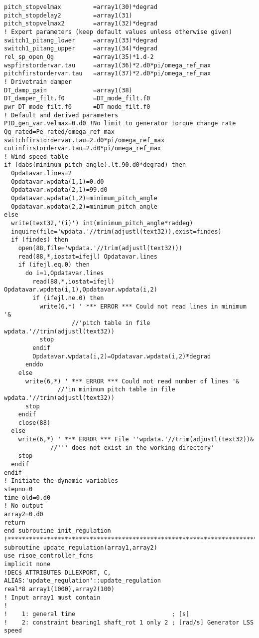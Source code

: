 {\begin{verbatim}
pitch_stopvelmax         =array1(30)*degrad
pitch_stopdelay2         =array1(31)
pitch_stopvelmax2        =array1(32)*degrad
! Expert parameters (keep default values unless otherwise given)
switch1_pitang_lower     =array1(33)*degrad
switch1_pitang_upper     =array1(34)*degrad
rel_sp_open_Qg           =array1(35)*1.d-2
wspfirstordervar.tau     =array1(36)*2.d0*pi/omega_ref_max
pitchfirstordervar.tau   =array1(37)*2.d0*pi/omega_ref_max
! Drivetrain damper
DT_damp_gain             =array1(38)
DT_damper_filt.f0        =DT_mode_filt.f0
pwr_DT_mode_filt.f0      =DT_mode_filt.f0
! Default and derived parameters
PID_gen_var.velmax=0.d0 !No limit to generator torque change rate
Qg_rated=Pe_rated/omega_ref_max
switchfirstordervar.tau=2.d0*pi/omega_ref_max
cutinfirstordervar.tau=2.d0*pi/omega_ref_max
! Wind speed table
if (dabs(minimum_pitch_angle).lt.90.d0*degrad) then
  Opdatavar.lines=2
  Opdatavar.wpdata(1,1)=0.d0
  Opdatavar.wpdata(2,1)=99.d0
  Opdatavar.wpdata(1,2)=minimum_pitch_angle
  Opdatavar.wpdata(2,2)=minimum_pitch_angle
else
  write(text32,'(i)') int(minimum_pitch_angle*raddeg)
  inquire(file='wpdata.'//trim(adjustl(text32)),exist=findes)
  if (findes) then
    open(88,file='wpdata.'//trim(adjustl(text32)))
    read(88,*,iostat=ifejl) Opdatavar.lines
    if (ifejl.eq.0) then
      do i=1,Opdatavar.lines
        read(88,*,iostat=ifejl) Opdatavar.wpdata(i,1),Opdatavar.wpdata(i,2)
        if (ifejl.ne.0) then
          write(6,*) ' *** ERROR *** Could not read lines in minimum '&
                   //'pitch table in file wpdata.'//trim(adjustl(text32))
          stop
        endif
        Opdatavar.wpdata(i,2)=Opdatavar.wpdata(i,2)*degrad
      enddo
    else
      write(6,*) ' *** ERROR *** Could not read number of lines '&
               //'in minimum pitch table in file wpdata.'//trim(adjustl(text32))
      stop
    endif
    close(88)
  else
    write(6,*) ' *** ERROR *** File ''wpdata.'//trim(adjustl(text32))&
             //''' does not exist in the working directory'
    stop
  endif
endif
! Initiate the dynamic variables
stepno=0
time_old=0.d0
! No output
array2=0.d0
return
end subroutine init_regulation
!**************************************************************************************************
subroutine update_regulation(array1,array2)
use risoe_controller_fcns
implicit none
!DEC$ ATTRIBUTES DLLEXPORT, C, ALIAS:'update_regulation'::update_regulation
real*8 array1(1000),array2(100)
! Input array1 must contain
!
!    1: general time                           ; [s]
!    2: constraint bearing1 shaft_rot 1 only 2 ; [rad/s] Generator LSS speed

\end{verbatim}}
